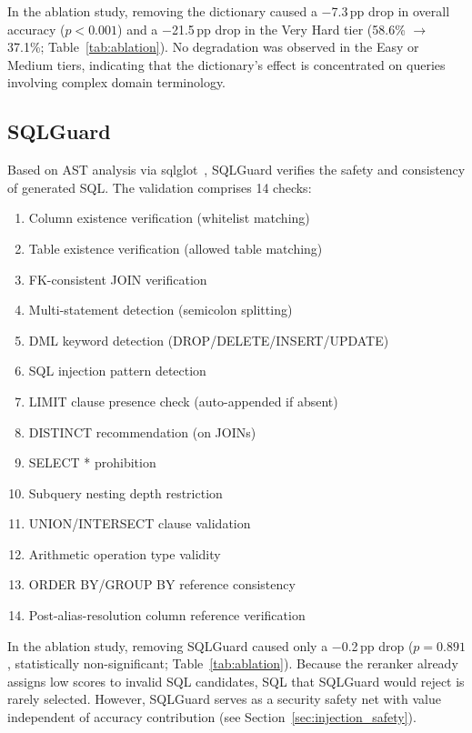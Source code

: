 \documentclass{npj-compt.mater}
\begin{document}
In the ablation study, removing the dictionary caused a $-$7.3\,pp
drop in overall accuracy ($p<0.001$) and a $-$21.5\,pp drop in the
Very Hard tier (58.6\% $\to$ 37.1\%; Table~\ref{tab:ablation}).
No degradation was observed in the Easy or Medium tiers, indicating
that the dictionary's effect is concentrated on queries involving
complex domain terminology.

\subsection{SQLGuard}
\label{sec:sqlguard}

Based on AST analysis via sqlglot~\cite{sqlglot2023},
SQLGuard verifies the safety and consistency of generated SQL.
The validation comprises 14 checks:

\begin{enumerate}[nosep]
  \item Column existence verification (whitelist matching)
  \item Table existence verification (allowed table matching)
  \item FK-consistent JOIN verification
  \item Multi-statement detection (semicolon splitting)
  \item DML keyword detection (DROP/DELETE/INSERT/UPDATE)
  \item SQL injection pattern detection
  \item LIMIT clause presence check (auto-appended if absent)
  \item DISTINCT recommendation (on JOINs)
  \item SELECT * prohibition
  \item Subquery nesting depth restriction
  \item UNION/INTERSECT clause validation
  \item Arithmetic operation type validity
  \item ORDER BY/GROUP BY reference consistency
  \item Post-alias-resolution column reference verification
\end{enumerate}

In the ablation study, removing SQLGuard caused only a $-$0.2\,pp
drop ($p=0.891$, statistically non-significant;
Table~\ref{tab:ablation}).
Because the reranker already assigns low scores to invalid SQL
candidates, SQL that SQLGuard would reject is rarely selected.
However, SQLGuard serves as a security safety net with value
independent of accuracy contribution
(see Section~\ref{sec:injection_safety}).
\end{document}
